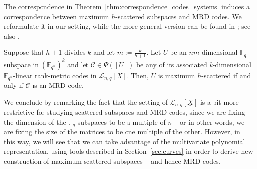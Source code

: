 The correspondence in Theorem~\ref{thm:correspondence_codes_systems} induces a correspondence between maximum $h$-scattered subspaces and MRD codes. We reformulate it in our setting, while the more general version can be found in \cite[Theorem 3.2]{zini2021scattered}; see also \cite[Theorem 4.9]{marino2022evasive}.

\begin{theorem}\label{thm:hscattered_MRD}
 Suppose that $h+1$ divides $k$ and let $m:=\frac{k}{h+1}$. Let $U$ be an $nm$-dimensional $\mathbb{F}_q$-subspace in $(\mathbb{F}_{q^n})^k$ and let $\mathcal{C}\in \Psi([U])$ be any of its associated $k$-dimensional ${\mathbb F}_{q^n}$-linear rank-metric codes in $\mathcal{L}_{n,q}[\underline{X}]$. Then, $U$ is maximum $h$-scattered if and only if $\mathcal{C}$ is an MRD code.
\end{theorem}

We conclude by remarking the fact that the setting of $\mathcal{L}_{n,q}[\underline{X}]$ is a bit more restrictive for studying scattered subspaces and MRD codes, since we are fixing the dimension of the $\mathbb{F}_q$-subspaces to be a multiple of $n$ -- or in other words, we are fixing the size of the matrices to be one multiple of the other. 
However, in this way, we will see that we can  take advantage of the multivariate polynomial representation, using tools described in  Section~\ref{sec:curves} in order to derive new construction of maximum scattered subspaces -- and hence MRD codes.

